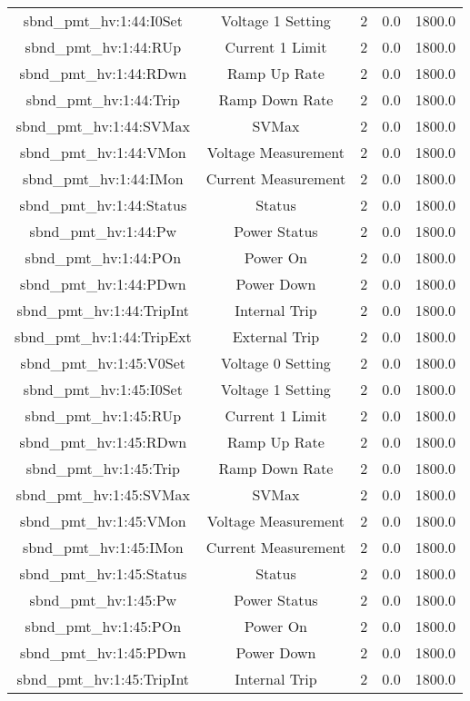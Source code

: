 \begin{table}[ptb]
\begin{tabular}{c | c c c c}
sbnd_pmt_hv:1:44:I0Set & Voltage 1 Setting & 2 & 0.0 & 1800.0\\ 
sbnd_pmt_hv:1:44:RUp & Current 1 Limit & 2 & 0.0 & 1800.0\\ 
sbnd_pmt_hv:1:44:RDwn & Ramp Up Rate & 2 & 0.0 & 1800.0\\ 
sbnd_pmt_hv:1:44:Trip & Ramp Down Rate & 2 & 0.0 & 1800.0\\ 
sbnd_pmt_hv:1:44:SVMax & SVMax & 2 & 0.0 & 1800.0\\ 
sbnd_pmt_hv:1:44:VMon & Voltage Measurement & 2 & 0.0 & 1800.0\\ 
sbnd_pmt_hv:1:44:IMon & Current Measurement & 2 & 0.0 & 1800.0\\ 
sbnd_pmt_hv:1:44:Status & Status & 2 & 0.0 & 1800.0\\ 
sbnd_pmt_hv:1:44:Pw & Power Status & 2 & 0.0 & 1800.0\\ 
sbnd_pmt_hv:1:44:POn & Power On & 2 & 0.0 & 1800.0\\ 
sbnd_pmt_hv:1:44:PDwn & Power Down & 2 & 0.0 & 1800.0\\ 
sbnd_pmt_hv:1:44:TripInt & Internal Trip & 2 & 0.0 & 1800.0\\ 
sbnd_pmt_hv:1:44:TripExt & External Trip & 2 & 0.0 & 1800.0\\ 
sbnd_pmt_hv:1:45:V0Set & Voltage 0 Setting & 2 & 0.0 & 1800.0\\ 
sbnd_pmt_hv:1:45:I0Set & Voltage 1 Setting & 2 & 0.0 & 1800.0\\ 
sbnd_pmt_hv:1:45:RUp & Current 1 Limit & 2 & 0.0 & 1800.0\\ 
sbnd_pmt_hv:1:45:RDwn & Ramp Up Rate & 2 & 0.0 & 1800.0\\ 
sbnd_pmt_hv:1:45:Trip & Ramp Down Rate & 2 & 0.0 & 1800.0\\ 
sbnd_pmt_hv:1:45:SVMax & SVMax & 2 & 0.0 & 1800.0\\ 
sbnd_pmt_hv:1:45:VMon & Voltage Measurement & 2 & 0.0 & 1800.0\\ 
sbnd_pmt_hv:1:45:IMon & Current Measurement & 2 & 0.0 & 1800.0\\ 
sbnd_pmt_hv:1:45:Status & Status & 2 & 0.0 & 1800.0\\ 
sbnd_pmt_hv:1:45:Pw & Power Status & 2 & 0.0 & 1800.0\\ 
sbnd_pmt_hv:1:45:POn & Power On & 2 & 0.0 & 1800.0\\ 
sbnd_pmt_hv:1:45:PDwn & Power Down & 2 & 0.0 & 1800.0\\ 
sbnd_pmt_hv:1:45:TripInt & Internal Trip & 2 & 0.0 & 1800.0\\ 

\end{tabular}
\end{table}
